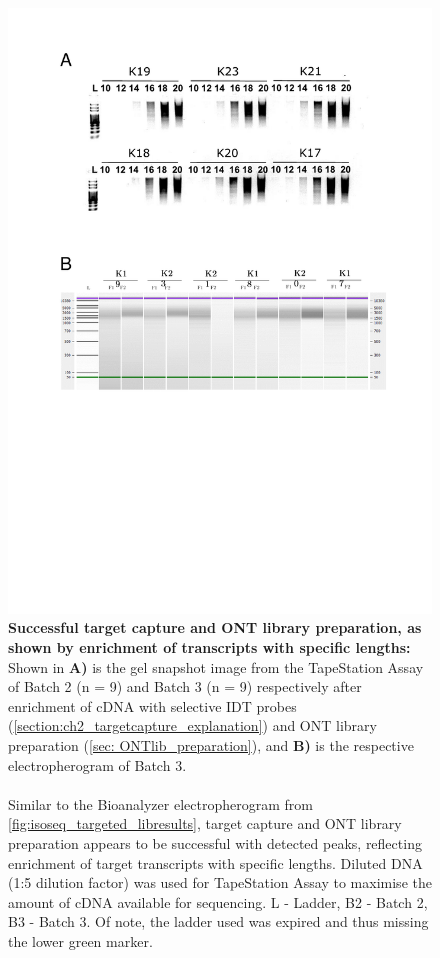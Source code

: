\begin{figure}[!htp]
	\centering
	\vspace{20pt}
	\includegraphics[page=3,trim={0 18cm 0cm 0cm},clip,scale = 0.75]{Figures/TargetedTranscriptome_ppt.pdf}
	\captionsetup{width=0.95\textwidth}
	\caption[ONT Targeted Transcriptome - Target Capture and library preparation]%
	{\textbf{Successful target capture and ONT library preparation, as shown by enrichment of transcripts with specific lengths:} Shown in \textbf{A)} is the gel snapshot image from the TapeStation Assay of Batch 2 (n = 9) and Batch 3 (n = 9) respectively after enrichment of cDNA with selective IDT probes (\cref{section:ch2_targetcapture_explanation}) and ONT library preparation (\cref{sec: ONTlib_preparation}), and \textbf{B)} is the respective electropherogram of Batch 3. 
	\\
	\\
	Similar to the Bioanalyzer electropherogram from \cref{fig:isoseq_targeted_libresults}, target capture and ONT library preparation appears to be successful with detected peaks, reflecting enrichment of target transcripts with specific lengths. Diluted DNA (1:5 dilution factor) was used for TapeStation Assay to maximise the amount of cDNA available for sequencing. L - Ladder, B2 - Batch 2, B3 - Batch 3. Of note, the ladder used was expired and thus missing the lower green marker. }  
	\label{fig:ONT_targeted_libresults}
\end{figure}


